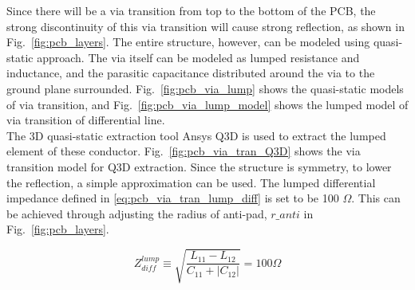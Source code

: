 \documentclass{book}  %
\renewcommand{\subsection}[1]{\psubsection{#1}}
\begin{document}
\begin{paper}
\subsection{Via Transition}
\label{subsec:via_tran}
Since there will be a via transition from top to the bottom of the PCB, the strong discontinuity of this via transition will cause strong reflection, as shown in Fig.~\ref{fig:pcb_layers}. The entire structure, however, can be modeled using quasi-static approach. The via itself can be modeled as lumped resistance and inductance, and the parasitic capacitance distributed around the via to the ground plane surrounded. Fig.~\ref{fig:pcb_via_lump} shows the quasi-static models of via transition, and Fig.~\ref{fig:pcb_via_lump_model} shows the lumped model of via transition of differential line. \\

The 3D quasi-static extraction tool Ansys Q3D \cite{na_ansys_q3d} is used to extract the lumped element of these conductor. Fig.~\ref{fig:pcb_via_tran_Q3D} shows the via transition model for Q3D extraction. Since the structure is symmetry, to lower the reflection, a simple approximation can be used. The lumped differential impedance defined in \ref{eq:pcb_via_tran_lump_diff} is set to be 100 $\Omega$. This can be achieved through adjusting the radius of anti-pad, $r\_anti$ in Fig.~\ref{fig:pcb_layers}.

\begin{equation}\label{eq:pcb_via_tran_lump_diff}
Z^{lump}_{diff}\equiv \sqrt{\frac{L_{11} - L_{12}}{C_{11} + \left|C_{12}\right|}} = 100\Omega
\end{equation}


\end{paper}
\end{document}
